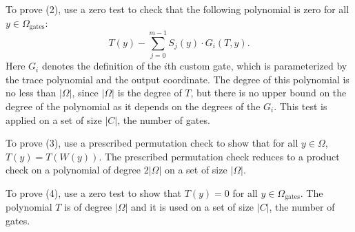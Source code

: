 \documentclass[11pt]{article}
\begin{document}
To prove (2), use a zero test to check that the following polynomial is zero for all $y \in \Omega_{\text{gates}}$:
\begin{equation}
	T(y) - \sum_{j=0}^{m-1} S_j(y) \cdot G_i(T, y).
\end{equation}
Here $G_i$ denotes the definition of the $i$th custom gate, which is parameterized by the trace polynomial and
the output coordinate. The degree of this polynomial is no less than $|\Omega|$, since $|\Omega|$ is the degree
of $T$, but there is no upper bound on the degree of the polynomial as it depends on the degrees of the $G_i$.
This test is applied on a set of size $|C|$, the number of gates.

To prove (3), use a prescribed permutation check to show that for all $y \in \Omega$, $T(y) = T(W(y))$.
The prescribed permutation check reduces to a product check on a polynomial of degree $2|\Omega|$
on a set of size $|\Omega|$.

To prove (4), use a zero test to show that $T(y) = 0$ for all $y \in \Omega_{\text{gates}}$. 
The polynomial $T$ is of degree $|\Omega|$ and it is used on a set of size $|C|$, the number of gates.
\end{document}
